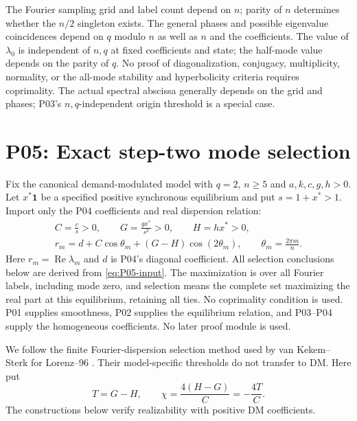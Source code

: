 \documentclass[11pt]{article}
\let\OriginalCite\cite
\renewcommand{\cite}[2][]{%
  \textcolor{CitationRed}{%
    \if\relax\detokenize{#1}\relax
      \OriginalCite{#2}%
    \else
      \OriginalCite[#1]{#2}%
    \fi}}
\newcommand{\one}{\mathbf{1}}
\DeclareMathOperator{\Ree}{Re}
\theoremstyle{definition}
\theoremstyle{remark}
\begin{document}
The Fourier sampling grid and label count depend on $n$; parity of
$n$ determines whether the $n/2$ singleton exists. The general phases
and possible eigenvalue coincidences depend on $q$ modulo $n$ as
well as $n$ and the coefficients. The value of $\lambda_0$ is
independent of $n,q$ at fixed coefficients and state; the half-mode
value depends on the parity of $q$. No proof of diagonalization,
conjugacy, multiplicity, normality, or the all-mode stability and
hyperbolicity criteria requires coprimality. The actual spectral
abscissa generally depends on the grid and phases; P03's
$n,q$-independent origin threshold is a special case.


\section{P05: Exact step-two mode selection}
\label{sec:P05}
Fix the canonical demand-modulated model with $q=2$, $n\ge5$ and
$a,k,c,g,h>0$. Let $x^*\one$ be a specified positive synchronous
equilibrium and put $s=1+x^*>1$. Import only the P04 coefficients
and real dispersion relation:
\begin{equation}
\begin{gathered}
 C=\frac cs>0,\qquad G=\frac{gx^*}{s^2}>0,\qquad H=hx^*>0,\\
 r_m=d+C\cos\theta_m+(G-H)\cos(2\theta_m),\qquad
 \theta_m=\frac{2\pi m}{n}.
\end{gathered}
 \label{eq:P05-input}
\end{equation}
Here $r_m=\Ree\lambda_m$ and $d$ is P04's diagonal coefficient.
All selection conclusions below are derived from \eqref{eq:P05-input}.
The maximization is over all Fourier labels, including mode zero, and
selection means the complete set maximizing the real part at this
equilibrium, retaining all ties. No coprimality condition is used.
P01 supplies smoothness, P02 supplies the equilibrium relation, and P03--P04
supply the homogeneous coefficients. No later proof module is used.


We follow the finite Fourier-dispersion selection method used by
van Kekem--Sterk for Lorenz--96 \cite[\S2.1, Proposition~5]{vanKekemSterk2018}.
Their model-specific thresholds do not transfer to DM. Here put
\begin{equation}
 T=G-H,\qquad \chi=\frac{4(H-G)}C=-\frac{4T}C.
 \label{eq:P05-control}
\end{equation}
The constructions below verify realizability with positive DM coefficients.
\end{document}
